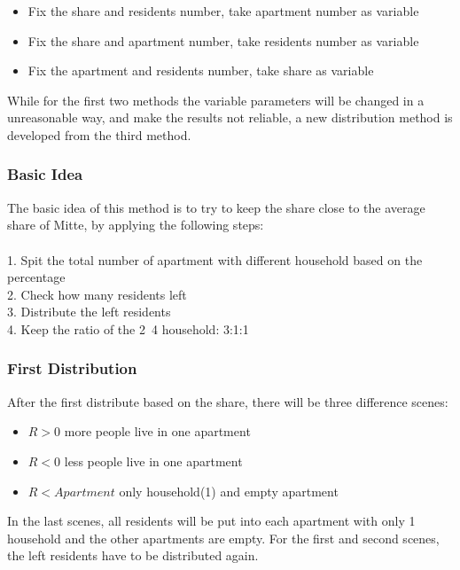 \documentclass[11pt]{article}
\begin{document}
\begin{itemize}
\item Fix the share and residents number, take apartment number as variable
\item Fix the share and apartment number, take residents number as variable
\item Fix the apartment and residents number, take share as variable
\end{itemize}

While for the first two methods the variable parameters will be changed in a unreasonable way, and make the results not reliable, a new distribution method is developed from the third method. 

\subsubsection{Basic Idea}
The basic idea of this method is to try to keep the share close to the average share of Mitte, by applying the following steps:\\
\\
1. Spit the total number of apartment with different household based on the percentage \\
2. Check how many residents left\\
3. Distribute the left residents\\
4. Keep the ratio of the 2~4 household: 3:1:1

\subsubsection{First Distribution}
After the first distribute based on the share, there will be three difference scenes:\\
\begin{itemize}
\item $R > 0$   more people live in one apartment
\item $R < 0$   less people live in one apartment
\item $R < Apartment$  only household(1) and empty apartment
\end{itemize}

In the last scenes, all residents will be put into each apartment with only 1 household and the other apartments are empty. For the first and second scenes, the left residents have to be distributed again.
\end{document}
